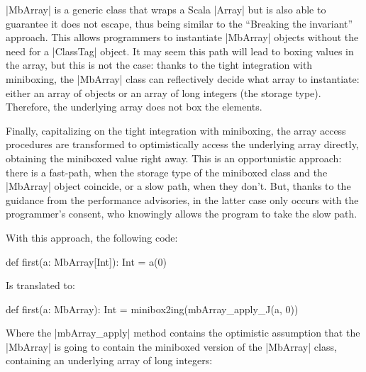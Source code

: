 |MbArray| is a generic class that wraps a Scala |Array| but is also able to guarantee it does not escape, thus being similar to the ``Breaking the invariant'' approach. This allows programmers to instantiate |MbArray| objects without the need for a |ClassTag| object. It may seem this path will lead to boxing values in the array, but this is not the case: thanks to the tight integration with miniboxing, the |MbArray| class can reflectively decide what array to instantiate: either an array of objects or an array of long integers (the storage type). Therefore, the underlying array does not box the elements.

Finally, capitalizing on the tight integration with miniboxing, the array access procedures are transformed to optimistically access the underlying array directly, obtaining the miniboxed value right away. This is an opportunistic approach: there is a fast-path, when the storage type of the miniboxed class and the |MbArray| object coincide, or a slow path, when they don't. But, thanks to the guidance from the performance advisories, in the latter case only occurs with the programmer's consent, who knowingly allows the program to take the slow path.

With this approach, the following code:

\begin{lstlisting-nobreak}
 def first(a: MbArray[Int]): Int = a(0)
\end{lstlisting-nobreak}

Is translated to:

\begin{lstlisting-nobreak}
 def first(a: MbArray): Int =
   minibox2ing(mbArray_apply_J(a, 0))
\end{lstlisting-nobreak}

Where the |mbArray_apply| method contains the optimistic assumption that the |MbArray| is going to contain the miniboxed version of the |MbArray| class, containing an underlying array of long integers:

